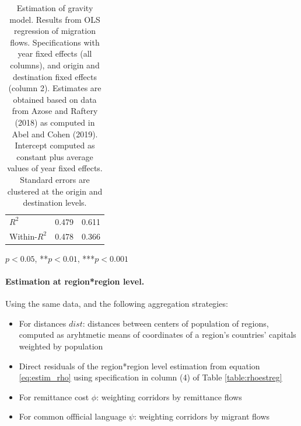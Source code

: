 \documentclass[letterpaper,11pt]{article}
\begin{document}
\begin{table}[H]
\begin{threeparttable}
\begin{tabular}{lrr}
		$R^2$           &     0.479 &                     0.611 \\
		Within-$R^2$    &     0.478 &                     0.366 \\
		\bottomrule
		\end{tabular}
		\begin{tablenotes}
			\item *$p<0.05$, **$p<0.01$, ***$p<0.001$
		\end{tablenotes}
	\end{threeparttable}
	\caption{Estimation of gravity model. Results from OLS regression of migration flows. Specifications with year fixed effects (all columns), and origin and destination fixed effects (column 2). Estimates are obtained based on data from Azose and Raftery (2018) as computed in Abel and Cohen (2019). Intercept computed as constant plus average values of year fixed effects. Standard errors are clustered at the origin and destination levels.}
	\label{table:gravest}
\end{table}


\paragraph{Estimation at region*region level.}
Using the same data, and the following aggregation strategies: 
\begin{itemize}
	\item For distances $dist$: distances between centers of population of regions, computed as aryhtmetic means of coordinates of a region's countries' capitals weighted by population
	\item Direct residuals of the region*region level estimation from equation \ref{eq:estim_rho} using specification in column (4) of Table \ref{table:rhoestreg}
	\item For remittance cost $\phi$: weighting corridors by remittance flows 
	\item For common offficial language $\psi$: weighting corridors by migrant flows
\end{itemize}
\end{document}
